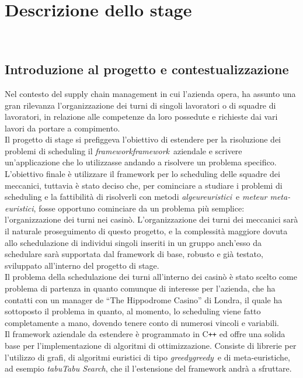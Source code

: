 
\chapter{Descrizione dello stage}
\label{cap:descrizione-stage}

\\

\section{Introduzione al progetto e contestualizzazione}
Nel contesto del supply chain management in cui l’azienda opera, ha assunto una gran rilevanza l’organizzazione dei turni di singoli lavoratori o di squadre di lavoratori, in relazione alle competenze da loro possedute e richieste dai vari lavori da portare a compimento. \\
Il progetto di stage si prefiggeva l'obiettivo di estendere per la risoluzione dei problemi di scheduling il \emph{\gls{framework}framework}\glsfirstoccur\ aziendale e scrivere un'applicazione che lo utilizzasse andando a risolvere un problema specifico. L'obiettivo finale è utilizzare il framework per lo scheduling delle squadre dei meccanici, tuttavia è stato deciso che, per cominciare a studiare i problemi di scheduling e la fattibilità di risolverli con metodi \emph{\gls{algeur}euristici}\glsfirstoccur\ e \emph{\gls{meteur} meta-euristici}\glsfirstoccur, fosse opportuno cominciare da un problema più semplice: l'organizzazione dei turni nei casinò. L'organizzazione dei turni dei meccanici sarà il naturale proseguimento di questo progetto, e la complessità maggiore dovuta allo schedulazione di individui singoli inseriti in un gruppo anch'esso da schedulare sarà supportata dal framework di base, robusto e già testato, sviluppato all'interno del progetto di stage. \\
Il problema della schedulazione dei turni all'interno dei casinò è stato scelto come problema di partenza in quanto comunque di interesse per l'azienda, che ha contatti con un manager de ``The Hippodrome Casino'' di Londra, il quale ha sottoposto il problema in quanto, al momento, lo scheduling viene fatto completamente a mano, dovendo tenere conto di numerosi vincoli e variabili. \\
Il framework aziendale da estendere è programmato in C\texttt{++} ed offre una solida base per l'implementazione di algoritmi di ottimizzazione. Consiste di librerie per l'utilizzo di grafi, di algoritmi euristici di tipo \emph{\gls{greedy}greedy}\glsfirstoccur\ e di meta-euristiche, ad esempio \emph{\gls{tabu}Tabu Search}\glsfirstoccur, che il l'estensione del framework andrà a sfruttare.
